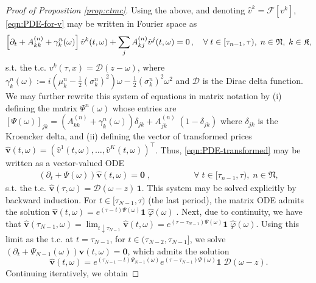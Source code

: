 \documentclass[onefignum,onetabnum]{siamonline190516}
\begin{document}
\begin{proof}[{Proof of Proposition \ref{prop:ctmc}}]
Using the above, and denoting $\hat{v}^k = \mathcal{F}[v^k]$, \eqref{eqn:PDE-for-v} may be written in Fourier space as
\begin{equation}
    \left[ \partial_t + A^{(n)}_{kk}
    + \gamma^n_k(\omega) \right] \hat{v}^k(t, \omega) + \sum_j A^{(n)}_{kj} \hat{v}^j(t, \omega) = 0\,,
    \quad \forall\;t\in[\tau_{n-1},\tau),\; n\in\mathfrak{N},\; k\in{\mathfrak{K}},
    \label{eqn:PDE-transformed}
\end{equation}%
s.t. the t.c. $v^k(\tau,x)=\mathcal{D}(z-\omega)$, where $\gamma^n_k(\omega):=i \left(\mu_k^n - \tfrac{1}{2} (\sigma_k^n)^2\right) \omega
    - \tfrac{1}{2} (\sigma_k^n)^2 \omega^2$ and $\mathcal{D}$ is the Dirac delta function.
We may further rewrite this system of equations in matrix notation by (i) defining the matrix $\Psi^n(\omega)$ whose entries are $
    [\Psi(\omega)]_{jk} = \left( A^{(n)}_{kk} +\gamma^n_k(\omega) \right)\delta_{jk} + A^{(n)}_{jk} \;(1 - \delta_{jk})$
where $\delta_{jk}$ is the Kroencker delta, and (ii) defining the vector of transformed prices $\boldsymbol{\hat{v}}(t, \omega)=({\hat{v}}^1(t, \omega),\dots,{\hat{v}}^K(t, \omega))^\intercal$.  Thus, \eqref{eqn:PDE-transformed} may be written as a vector-valued ODE
\begin{align}
    (\partial_t + \Psi(\omega)) \boldsymbol{\hat{v}}(t, \omega) = \boldsymbol{0}\;, \qquad\qquad \quad \forall\;t\in[\tau_{n-1},\tau),\; n\in\mathfrak{N},
\end{align}
s.t. the t.c. $\boldsymbol{\hat{v}}(\tau, \omega) = \mathcal{D}(\omega-z)\,\boldsymbol{1}$.
This system may be solved explicitly by backward induction. For $t \in [\tau_{N-1}, \tau)$ (the last period), the matrix ODE admits the solution
$\boldsymbol{\hat{v}}(t, \omega) = e^{(\tau - t) \Psi(\omega)} \boldsymbol{1}  \;\hat{\varphi}(\omega)\;.
$
Next, due to continuity, we have that
$
     \boldsymbol{\hat{v}}(\tau_{N-1}, \omega) = \lim_{t \downarrow \tau_{N-1}}  \boldsymbol{\hat{v}}(t, \omega) = e^{(\tau - \tau_{N-1}) \Psi(\omega)}\boldsymbol{1}\;\hat{\varphi}(\omega)$.
Using this limit as the t.c. at $t=\tau_{N-1}$, for $t\in(\tau_{N-2},\tau_{N-1}]$, we solve
    $(\partial_t + \Psi_{N-1}(\omega)) \boldsymbol{\hat{v}}(t, \omega) = \boldsymbol{0}$, which admits the solution
\[
\boldsymbol{\hat{v}}(t, \omega) = e^{(\tau_{N-1} - t) \Psi_{N-1}(\omega)} e^{(\tau - \tau_{N-1}) \Psi(\omega)}\boldsymbol{1}  \;  \mathcal{D}(\omega-z).
\]
Continuing iteratively, we obtain

\end{proof}
\end{document}
